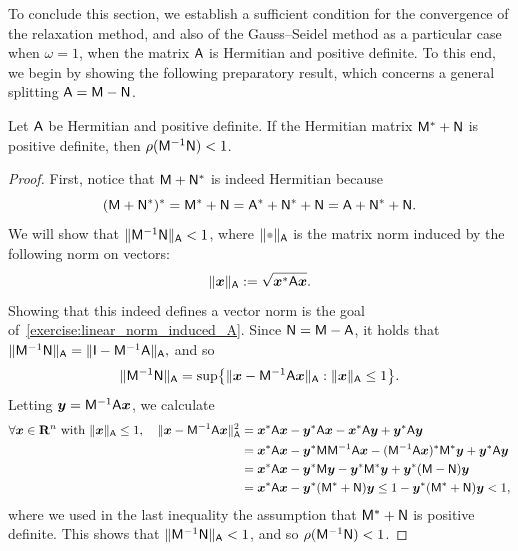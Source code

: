 To conclude this section,
we establish a sufficient condition for the convergence of the relaxation method,
and also of the Gauss--Seidel method as a particular case when $\omega = 1$,
when the matrix $\mathsf A$ is Hermitian and positive definite.
To this end, we begin by showing the following preparatory result,
which concerns a general splitting $\mathsf A = \mathsf M - \mathsf N$.
\begin{proposition}
    \label{proposition:criterion_convergence}
    Let $\mathsf A$ be Hermitian and positive definite.
    If the Hermitian matrix $\mathsf M^* + \mathsf N$ is positive definite,
    then $\rho(\mathsf M^{-1} \mathsf N) < 1$.
\end{proposition}
\begin{proof}
    First, notice that $\mathsf M + \mathsf N^*$ is indeed Hermitian because
    \[
        (\mathsf M + \mathsf N^*)^* = \mathsf M^* + \mathsf N = \mathsf A^* + \mathsf N^* + \mathsf N = \mathsf A + \mathsf N^* + \mathsf N.
    \]
    We will show that $\lVert\mathsf M^{-1} \mathsf N\rVert_{\mathsf A} < 1$,
    where $\norm{\placeholder}_{\mat A}$ is the matrix norm induced by the following norm on vectors:
    \[
        \lVert\mathbf{\boldsymbol{x}}\rVert_{\mathsf A} := \sqrt{\mathbf{\boldsymbol{x}}^* \mathsf A \mathbf{\boldsymbol{x}}}.
    \]
    Showing that this indeed defines a vector norm is the goal of~\cref{exercise:linear_norm_induced_A}.
    Since $\mathsf N = \mathsf M - \mathsf A$, it holds that
    \(
        \lVert\mathsf M^{-1} \mathsf N\rVert_{\mathsf A}
        = \lVert\mathsf I - \mathsf M^{-1} \mathsf A\rVert_{\mathsf A},
    \)
    and so
    \[
        \lVert\mathsf M^{-1} \mathsf N\rVert_{\mathsf A}
        = \sup \bigl\{ \lVert\mathbf{\boldsymbol{x}} - \mathsf M^{-1} \mathsf A \mathbf{\boldsymbol{x}}\rVert_{\mathsf A}: \lVert\mathbf{\boldsymbol{x}}\rVert_{\mathsf A} \leq 1 \bigr\}.
    \]
    Letting $\mathbf{\boldsymbol{y}} = \mathsf M^{-1} \mathsf A \mathbf{\boldsymbol{x}}$, we calculate
    \begin{align*}
        \forall \mathbf{\boldsymbol{x}} \in \mathbf R^n \text{~with~} \lVert\mathbf{\boldsymbol{x}}\rVert_{\mathsf A} \leq 1, \quad
        \lVert\mathbf{\boldsymbol{x}} - \mathsf M^{-1} \mathsf A \mathbf{\boldsymbol{x}}\rVert_{\mathsf A}^2
        &= \mathbf{\boldsymbol{x}}^* \mathsf A \mathbf{\boldsymbol{x}} - \mathbf{\boldsymbol{y}}^* \mathsf A \mathbf{\boldsymbol{x}} - \mathbf{\boldsymbol{x}}^* \mathsf A \mathbf{\boldsymbol{y}} + \mathbf{\boldsymbol{y}}^* \mathsf A \mathbf{\boldsymbol{y}} \\
        &= \mathbf{\boldsymbol{x}}^* \mathsf A \mathbf{\boldsymbol{x}} - \mathbf{\boldsymbol{y}}^* \mathsf M \mathsf M^{-1} \mathsf A \mathbf{\boldsymbol{x}} - (\mathsf M^{-1} \mathsf A \mathbf{\boldsymbol{x}})^* \mathsf M^* \mathbf{\boldsymbol{y}} + \mathbf{\boldsymbol{y}}^* \mathsf A \mathbf{\boldsymbol{y}} \\
        &= \mathbf{\boldsymbol{x}}^* \mathsf A \mathbf{\boldsymbol{x}} - \mathbf{\boldsymbol{y}}^* \mathsf M \mathbf{\boldsymbol{y}} - \mathbf{\boldsymbol{y}}^* \mathsf M^* \mathbf{\boldsymbol{y}} + \mathbf{\boldsymbol{y}}^* (\mathsf M - \mathsf N) \mathbf{\boldsymbol{y}} \\
        &= \mathbf{\boldsymbol{x}}^* \mathsf A \mathbf{\boldsymbol{x}} - \mathbf{\boldsymbol{y}}^* (\mathsf M^* + \mathsf N) \mathbf{\boldsymbol{y}} \leq 1 - \mathbf{\boldsymbol{y}}^* (\mathsf M^* + \mathsf N) \mathbf{\boldsymbol{y}} < 1,
    \end{align*}
    where we used in the last inequality the assumption that $\mathsf M^* + \mathsf N$ is positive definite.
    This shows that \( \lVert\mathsf M^{-1} \mathsf N\rVert_{\mathsf  A} < 1\), and so $\rho(\mathsf M^{-1} \mathsf N) < 1$.
\end{proof}

